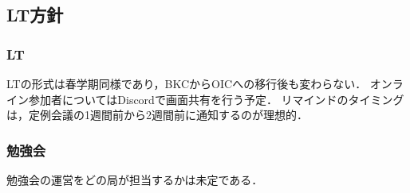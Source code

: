 \subsection*{LT方針}


\subsubsection*{LT}
LTの形式は春学期同様であり，BKCからOICへの移行後も変わらない．
オンライン参加者についてはDiscordで画面共有を行う予定．
リマインドのタイミングは，定例会議の1週間前から2週間前に通知するのが理想的．

\subsubsection*{勉強会}
勉強会の運営をどの局が担当するかは未定である．
